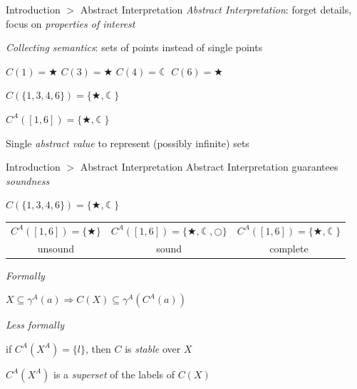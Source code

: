 \documentclass[11pt]{beamer}
\begin{document}
\begin{frame}{Introduction $>$ Abstract Interpretation}
\emph{Abstract Interpretation}: forget details, focus on \emph{properties of interest}

\vspace{2em}

\emph{Collecting semantics}: sets of points instead of single points
\begin{center}
 $C(1) = \bigstar$ \hspace{1.5em}
 $C(3) = \bigstar$ \hspace{1.5em} 
 $C(4) = \leftmoon$ \hspace{1.5em}
 $C(6) = \bigstar$
\end{center}

\begin{center}
 $C(\{1, 3, 4, 6\}) = \{\bigstar, \leftmoon\}$
\end{center}

\begin{center}
 $C^A([1, 6]) = \{\bigstar, \leftmoon\}$
\end{center}
Single \emph{abstract value} to represent (possibly infinite) sets
\end{frame}

\begin{frame}{Introduction $>$ Abstract Interpretation}
Abstract Interpretation guarantees \emph{soundness}

\begin{center}
$C(\{1, 3, 4, 6\}) = \{\bigstar, \leftmoon\}$

\vspace{1.5em}

\begin{tabular}{c c c}
 $C^A([1, 6]) = \{\bigstar\}$ &
 $C^A([1, 6]) = \{\bigstar, \leftmoon, \bigcirc\}$ &
 $C^A([1, 6]) = \{\bigstar, \leftmoon\}$ \\
 unsound & sound & complete
\end{tabular}
\end{center}

\emph{Formally}
\begin{center}
$X \subseteq \gamma^A(a) \Rightarrow C(X) \subseteq \gamma^A(C^A(a))$
\end{center}

\emph{Less formally}
\begin{center}
if $C^A(X^A) = \{l\}$, then $C$ is \emph{stable} over $X$

$C^A(X^A)$ is a \emph{superset} of the labels of $C(X)$
\end{center}
\end{frame}
\end{document}
